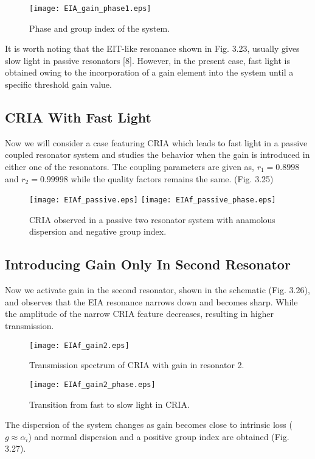 \begin{figure}[h]
\centering
\texttt{[image: EIA\_gain\_phase1.eps]}
\caption{Phase and group index of the system.}
\end{figure}

It is worth noting that the EIT-like resonance shown in Fig. 3.23, usually gives slow light in passive resonators [8]. However, in the present case, fast light is obtained owing to the incorporation of a gain element into the system until a specific threshold gain value.

\subsection{CRIA With Fast Light}
Now we will consider a case featuring CRIA which leads to fast light in a passive coupled resonator system and studies the behavior when the gain is introduced in either one of the resonators. The coupling parameters are given as, $r_{1} = 0.8998$ and $r_{2} = 0.99998$ while the quality factors remains the same. (Fig. 3.25)

\begin{figure}[h]
\centering
\texttt{[image: EIAf\_passive.eps]}
\texttt{[image: EIAf\_passive\_phase.eps]}
\caption{CRIA observed in a passive two resonator system with anamolous dispersion and negative group index.}
\end{figure}

\subsection{Introducing Gain Only In Second Resonator}
Now we activate gain in the second resonator, shown in the schematic (Fig. 3.26), and observes that the EIA resonance narrows down and becomes sharp. While the amplitude of the narrow CRIA feature decreases, resulting in higher transmission. 

\begin{figure}[h]
\centering 
\texttt{[image: EIAf\_gain2.eps]}
\caption{Transmission spectrum of CRIA with gain in resonator 2.}
\end{figure}


\begin{figure}[h]
\centering
\texttt{[image: EIAf\_gain2\_phase.eps]}
\caption{Transition from fast to slow light in CRIA.}
\end{figure}

The dispersion of the system changes as gain becomes close to intrinsic loss ($g \approx \alpha_{i}$) and normal dispersion and a positive group index are obtained (Fig. 3.27).

